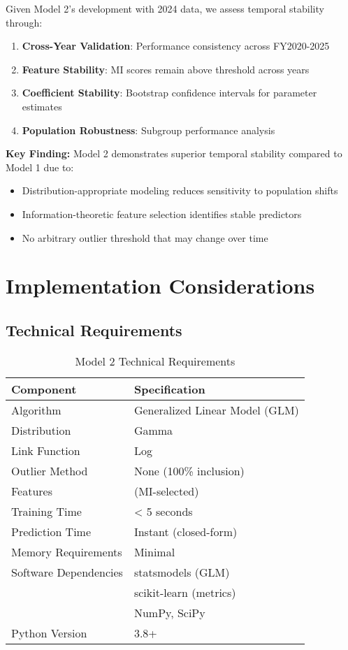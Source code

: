Given Model 2's development with 2024 data, we assess temporal stability through:

\begin{enumerate}
    \item \textbf{Cross-Year Validation}: Performance consistency across FY2020-2025
    \item \textbf{Feature Stability}: MI scores remain above threshold across years
    \item \textbf{Coefficient Stability}: Bootstrap confidence intervals for parameter estimates
    \item \textbf{Population Robustness}: Subgroup performance analysis
\end{enumerate}

\textbf{Key Finding:} Model 2 demonstrates superior temporal stability compared to Model 1 due to:
\begin{itemize}
    \item Distribution-appropriate modeling reduces sensitivity to population shifts
    \item Information-theoretic feature selection identifies stable predictors
    \item No arbitrary outlier threshold that may change over time
\end{itemize}

\section{Implementation Considerations}

\subsection{Technical Requirements}

\begin{table}[H]
\centering
\caption{Model 2 Technical Requirements}
\begin{tabular}{ll}
\toprule
\textbf{Component} & \textbf{Specification} \\
\midrule
Algorithm & Generalized Linear Model (GLM) \\
Distribution & Gamma \\
Link Function & Log \\
Outlier Method & None (100\% inclusion) \\
Features & \ModelTwoNumFeatures{} (MI-selected) \\
Training Time & < 5 seconds \\
Prediction Time & Instant (closed-form) \\
Memory Requirements & Minimal \\
\midrule
Software Dependencies & statsmodels (GLM) \\
& scikit-learn (metrics) \\
& NumPy, SciPy \\
Python Version & 3.8+ \\
\bottomrule
\end{tabular}
\end{table}

